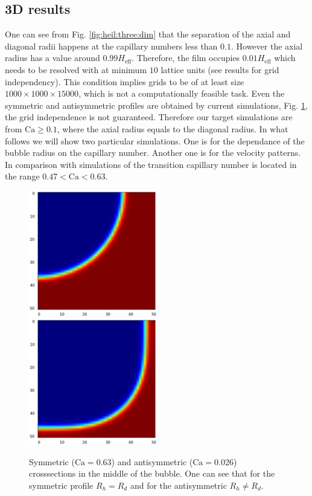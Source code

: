 \documentclass{CFD2011}
\newcommand{\Ca}{\mathrm{Ca}}
\begin{document}
\subsection{3D results}
One can see from Fig. \ref{fig:heil:three:dim} that the separation of the axial and diagonal radii
happens at the capillary numbers less than $0.1$. However the axial radius has a value around $0.99
H_{\mathrm{eff}}$. Therefore, the film occupies $0.01 H_{\mathrm{eff}}$ which needs to be resolved
with at minimum $10$ lattice units (see results for grid independency). This condition implies grids
to be of at least size $1000\times1000\times 15000$, which is not a computationally feasible
task. Even the symmetric and antisymmetric profiles are obtained by current simulations, Fig.
\ref{fig:sym:antisym}, the grid independence is not guaranteed.
Therefore our target simulations are from $\Ca\geq 0.1$, where the axial radius equals to the
diagonal radius. In what follows we will show two particular simulations. One is for the dependance
of the bubble radius on the capillary number. Another one is for the velocity patterns. In
comparison with simulations of \citet{heil-threedim} the transition capillary
number is located in the range $0.47<\Ca<0.63$. 
\begin{figure}[ht]
\includegraphics[width=0.5\textwidth]{Figures/sym.eps}\\
\includegraphics[width=0.5\textwidth]{Figures/antisym.eps}\\
\caption{Symmetric ($\Ca=0.63$) and antisymmetric ($\Ca=0.026$) crosssections in the middle of the
bubble. One can see that for the symmetric profile $R_h=R_d$ and for the antisymmetric $R_h\neq
R_d$.  \label{fig:sym:antisym} }
\end{figure}
 
\end{document}
